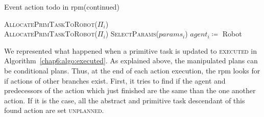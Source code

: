 \documentclass[a4paper,11pt,twoside]{StyleThese}
\begin{document}
\begin{algorithm}[!htb]
	\ContinuedFloat
	\caption{Event action todo in \acrshort{rpm}(continued)}
	\begin{algorithmic}
			\State \textsc{AllocatePrimTaskToRobot($\Pi_i$)}
		\Else
			\\
			\EndWhile
				\State \textsc{AllocatePrimTaskToRobot($\Pi_i$)}
			\EndIf
		\EndIf
	\EndFunction
	\Statex
		\State \textsc{SelectParams($params_i$)}
		\State $agent_i \coloneqq$ Robot
	\EndFor
	\EndFunction
	\end{algorithmic}
\end{algorithm}

\thispagestyle{example}
We represented what happened when a primitive task is updated to \textsc{executed} in Algorithm~\ref{chap6:algo:executed}. As explained above, the manipulated plans can be conditional plans. Thus, at the end of each action execution, the \acrshort{rpm} looks for if actions of other branches exist. First, it tries to find if the agent and predecessors of the action which just finished are the same than the one another action. If it is the case, all the abstract and primitive task descendant of this found action are set \textsc{unplanned}. 
\end{document}
